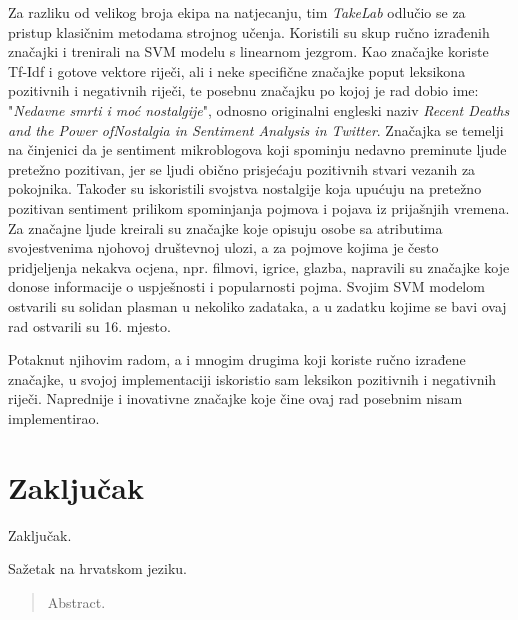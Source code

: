 \documentclass[times, utf8, zavrsni]{fer}
\begin{document}
Za razliku od velikog broja ekipa na natjecanju, tim \textit{TakeLab} odlučio se za pristup klasičnim metodama strojnog učenja. Koristili su skup ručno izrađenih značajki i trenirali na SVM modelu s linearnom jezgrom. Kao značajke koriste Tf-Idf i gotove vektore riječi, ali i neke specifične značajke poput leksikona pozitivnih i negativnih riječi, te posebnu značajku po kojoj je rad dobio ime: "\textit{Nedavne smrti i moć nostalgije}", odnosno originalni engleski naziv \textit{Recent Deaths and the Power ofNostalgia in Sentiment Analysis in Twitter}\citep{2017-takelab}. Značajka se temelji na činjenici da je sentiment mikroblogova koji spominju nedavno preminute ljude pretežno pozitivan, jer se ljudi obično prisjećaju pozitivnih stvari vezanih za pokojnika. Također su iskoristili svojstva nostalgije koja upućuju na pretežno pozitivan sentiment prilikom spominjanja pojmova i pojava iz prijašnjih vremena. Za značajne ljude kreirali su značajke koje opisuju osobe sa atributima svojestvenima njohovoj društevnoj ulozi, a za pojmove kojima je često pridjeljenja nekakva ocjena, npr. filmovi, igrice, glazba, napravili su značajke koje donose informacije o uspješnosti i popularnosti pojma. Svojim SVM modelom ostvarili su solidan plasman u nekoliko zadataka, a u zadatku kojime se bavi ovaj rad ostvarili su 16. mjesto.

Potaknut njihovim radom, a i mnogim drugima koji koriste ručno izrađene značajke, u svojoj implementaciji iskoristio sam leksikon pozitivnih i negativnih riječi. Naprednije i inovativne značajke koje čine ovaj rad posebnim nisam implementirao.


\chapter{Zaključak}
Zaključak.




\begin{sazetak}
Sažetak na hrvatskom jeziku.

\end{sazetak}

\begin{abstract}
Abstract.

\end{abstract}
\end{document}
